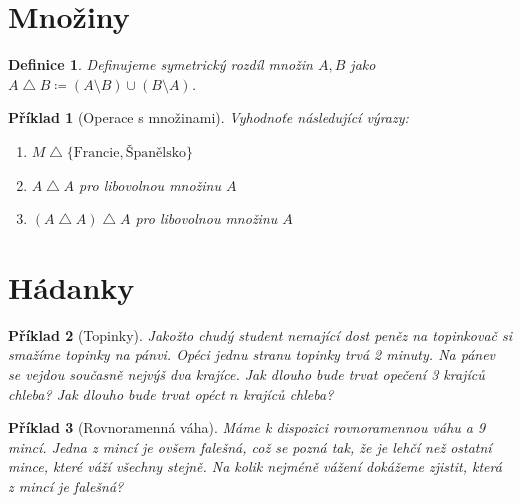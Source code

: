 \documentclass[10pt]{article}
\theoremstyle{definitionstyle}
\newtheorem{defn}{Definice}
\theoremstyle{problemstyle}
\newtheorem{problem}{Příklad}
\begin{document}
\section{Množiny}

\begin{defn}
    Definujeme symetrický rozdíl množin $A,B$ jako $A \bigtriangleup B \coloneq (A \setminus B) \cup (B \setminus A)$.
\end{defn}

\begin{problem}[Operace s množinami]
Vyhodnoťe následující výrazy:
\begin{enumerate}[label=(\alph*)]
    \item $M \bigtriangleup \{ \text{Francie}, \text{Španělsko} \}$
    \item $A \bigtriangleup A$ pro libovolnou množinu $A$
    \item $(A \bigtriangleup A) \bigtriangleup A$ pro libovolnou množinu $A$

\end{enumerate}
\end{problem}

\section{Hádanky}

\begin{problem}[Topinky]
Jakožto chudý student nemající dost peněz na topinkovač si smažíme topinky na pánvi. Opéci jednu stranu topinky trvá 2 minuty. Na pánev se vejdou současně nejvýš dva krajíce. Jak dlouho bude trvat opečení 3 krajíců chleba? Jak dlouho bude trvat opéct $n$ krajíců chleba?
\end{problem}

\begin{problem}[Rovnoramenná váha]
Máme k dispozici rovnoramennou váhu a 9 mincí. Jedna z mincí je ovšem falešná, což se pozná tak, že je lehčí než ostatní mince, které váží všechny stejně. Na kolik nejméně vážení dokážeme zjistit, která z mincí je falešná?
\end{problem}
\end{document}
